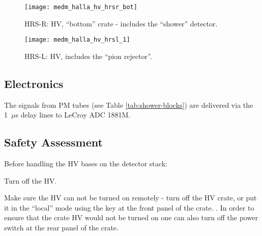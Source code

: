 {\begin{figure}
\begin{center}
  \texttt{[image: medm\_halla\_hv\_hrsr\_bot]}
\end{center}
\caption[Detectors: Shower HRS-R HV top]{
  HRS-R: HV, ``bottom'' crate - includes the ``shower'' detector.} 
\label{fig:hrs-det-hv-hrsr-bot}
\end{figure}

\begin{figure}
\begin{center}
  \texttt{[image: medm\_halla\_hv\_hrsl\_1]}
\end{center}
\caption[Detectors: Shower HRS-L HV]{
  HRS-L: HV, includes the ``pion rejector''.} 
\label{fig:hrs-det-hv-hrsl}
\end{figure}

\subsection{Electronics}

The signals from PM tubes %
(see Table \ref{tab:shower-blocks})
are delivered via the 1~$\mu$s delay lines to LeCroy ADC 1881M.

} %

\begin{safetyen}{10}{10}
\section{Safety Assessment}
\end{safetyen}

  
  Before handling the HV bases on the detector stack:
 \begin{list}{.~}{\setlength{\itemsep}{-0.15cm}}
    \item Turn off the HV.
    \item Make sure the HV can not be turned on remotely - turn off the HV crate,
          or put it in the ``local'' mode using the key at the front panel of
          the crate.
        . In order to ensure that the crate HV would not be turned on one can 
          also turn off the power switch at the rear panel of the crate.
 \end{list}


